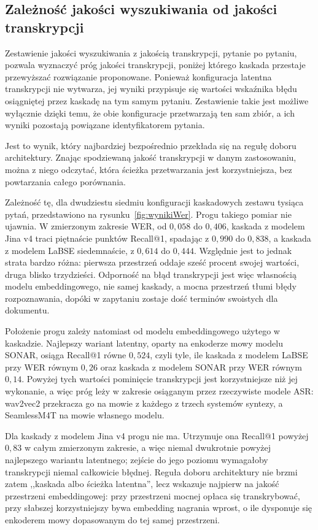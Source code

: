 \subsection{Zależność jakości wyszukiwania od jakości transkrypcji}
\label{sec:prog}
Zestawienie jakości wyszukiwania z jakością transkrypcji, pytanie po pytaniu, pozwala wyznaczyć
próg jakości transkrypcji, poniżej którego kaskada przestaje przewyższać rozwiązanie proponowane. Ponieważ konfiguracja latentna transkrypcji nie wytwarza, jej wyniki
przypisuje się wartości wskaźnika błędu osiągniętej przez kaskadę na tym samym pytaniu. Zestawienie
takie jest możliwe wyłącznie dzięki temu, że obie konfiguracje przetwarzają ten sam zbiór, a ich
wyniki pozostają powiązane identyfikatorem pytania.

Jest to wynik, który najbardziej bezpośrednio przekłada się na regułę doboru architektury. Znając
spodziewaną jakość transkrypcji w danym zastosowaniu, można z niego odczytać, która ścieżka
przetwarzania jest korzystniejsza, bez powtarzania całego porównania.

Zależność tę, dla dwudziestu siedmiu konfiguracji kaskadowych zestawu tysiąca pytań, przedstawiono na
rysunku~\ref{fig:wynikiWer}. Progu takiego pomiar nie ujawnia. W zmierzonym zakresie WER, od
$0{,}058$ do $0{,}406$, kaskada z modelem Jina v4 traci piętnaście punktów Recall@1, spadając
z $0{,}990$ do $0{,}838$, a kaskada z modelem LaBSE siedemnaście, z $0{,}614$ do $0{,}444$.
Względnie jest to jednak strata bardzo różna: pierwsza przestrzeń oddaje sześć procent swojej
wartości, druga blisko trzydzieści. Odporność na błąd transkrypcji jest więc własnością modelu
embeddingowego, nie samej kaskady, a mocna przestrzeń tłumi błędy rozpoznawania, dopóki
w zapytaniu zostaje dość terminów swoistych dla dokumentu.

Położenie progu zależy natomiast od modelu embeddingowego użytego w kaskadzie. Najlepszy wariant
latentny, oparty na enkoderze mowy modelu SONAR, osiąga Recall@1 równe $0{,}524$, czyli tyle, ile
kaskada z modelem LaBSE przy WER równym $0{,}26$ oraz kaskada z modelem SONAR przy WER równym
$0{,}14$. Powyżej tych wartości pominięcie transkrypcji jest korzystniejsze niż jej wykonanie,
a więc próg leży w zakresie osiąganym przez rzeczywiste modele ASR: wav2vec2 przekracza go na mowie
z każdego z trzech systemów syntezy, a SeamlessM4T na mowie własnego modelu.

Dla kaskady z modelem Jina v4 progu nie ma. Utrzymuje ona Recall@1 powyżej $0{,}83$ w całym zmierzonym
zakresie, a więc niemal dwukrotnie powyżej najlepszego wariantu latentnego; zejście do jego poziomu
wymagałoby transkrypcji niemal całkowicie błędnej. Reguła doboru architektury nie brzmi zatem
,,kaskada albo ścieżka latentna'', lecz wskazuje najpierw na jakość przestrzeni embeddingowej:
przy przestrzeni mocnej opłaca się transkrybować, przy słabszej korzystniejszy bywa embedding
nagrania wprost, o ile dysponuje się enkoderem mowy dopasowanym do tej samej przestrzeni.

